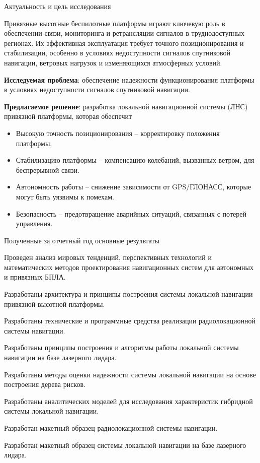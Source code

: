 \documentclass[10pt]{beamer}
\begin{document}
\begin{frame}{Актуальность и цель исследования}
\justifying
\small

Привязные высотные беспилотные платформы играют ключевую роль в обеспечении связи, мониторинга и ретрансляции сигналов в труднодоступных регионах. Их эффективная эксплуатация требует точного позиционирования и стабилизации, особенно в условиях недоступности сигналов спутниковой навигации, ветровых нагрузок и изменяющихся атмосферных условий.

\smallskip

{\bf Исследуемая проблема}: обеспечение надежности функционирования платформы в условиях недоступности сигналов спутниковой навигации.

\smallskip

{\bf Предлагаемое решение}: разработка локальной навигационной системы (ЛНС) привязной платформы, которая обеспечит
\begin{itemize}
\justifying
    \item Высокую точность позиционирования -- корректировку положения платформы,
    \item Стабилизацию платформы -- компенсацию колебаний, вызванных ветром, для беспрерывной связи.
    \item Автономность работы -- снижение зависимости от GPS/ГЛОНАСС, которые могут быть уязвимы к помехам.
    \item Безопасность -- предотвращение аварийных ситуаций, связанных с потерей управления.
\end{itemize}

\end{frame}


\begin{frame}{Полученные за отчетный год основные результаты}
 \begin{enumerate}
 \justifying
 \begin{small}
\item Проведен анализ мировых тенденций, перспективных технологий и математических методов проектирования навигационных систем для автономных и привязных БПЛА.
\item Разработаны архитектура и принципы построения системы локальной навигации привязной высотной платформы.
\item Разработаны технические и программные средства реализации радиолокационной системы навигации. 
\item Разработаны принципы построения и алгоритмы работы локальной системы навигации на базе лазерного лидара. 
\item Разработаны методы оценки надежности системы локальной навигации на основе построения дерева рисков. 
\item Разработаны аналитических моделей для исследования характеристик гибридной системы локальной навигации. 
\item Разработан макетный образец радиолокационной системы навигации. 
\item Разработан макетный образец системы локальной навигации на базе лазерного лидара. 
\end{small}
 \end{enumerate}
\end{frame}
\end{document}

